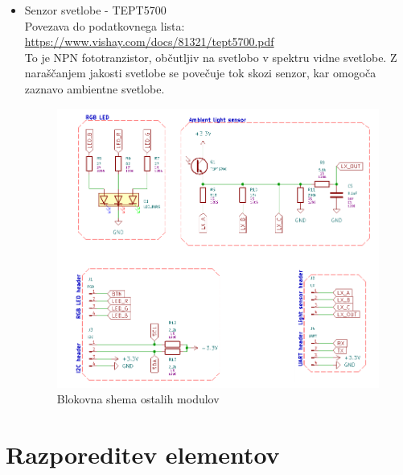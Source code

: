 \begin{itemize}
    \item Senzor svetlobe - TEPT5700 \\
    Povezava do podatkovnega lista: \url{https://www.vishay.com/docs/81321/tept5700.pdf} \\    
    To je NPN fototranzistor, občutljiv na svetlobo v spektru vidne svetlobe. Z naraščanjem jakosti svetlobe se povečuje tok skozi senzor, kar omogoča zaznavo ambientne svetlobe.
    \begin{figure}[H]
        \centering
        \includegraphics[width=0.9\linewidth]{Imgs/blok3.png}
        \caption{Blokovna shema ostalih modulov}
        \label{fig:enter-label}
    \end{figure}
\end{itemize}

\section{Razporeditev elementov}

